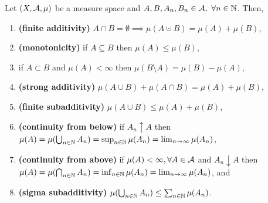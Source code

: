 \begin{thm}
	Let $(X, \mathcal{A}, \mu)$ be a measure space and $A, B, A_n, B_n \in \mathcal{A},\ \forall n \in \mathbb{N}$. Then,
	\begin{enumerate}
		\item \textbf{(finite additivity)} $A \cap B = \emptyset \implies \mu(A \cupdot B) = \mu(A) + \mu(B)$,
		\item \textbf{(monotonicity)} if $A \subseteq B$ then $\mu(A) \leq \mu(B)$,
		\item if $A \subset B$ and $\mu(A) < \infty$ then $\mu(B\setminus A) = \mu(B) - \mu(A)$,
		\item \textbf{(strong additivity)} $\mu(A \cup B) + \mu(A \cap B) = \mu(A) + \mu(B)$,
		\item \textbf{(finite subadditivity)} $\mu(A \cup B) \leq \mu(A) + \mu(B)$,
		\item \textbf{(continuity from below)} if $A_n \uparrow A$ then $\mu(A) = \mu(\bigcup_{n \in \mathbb{N}} A_n) = \sup_{n\in\mathbb{N}} \mu(A_n) = \lim_{n\to \infty} \mu(A_n)$,
		\item \textbf{(continuity from above)} if $\mu(A) < \infty, \forall A \in \mathcal{A}$ and $A_n \downarrow A$ then $\mu(A) = \mu(\bigcap_{n \in \mathbb{N}} A_n) = \inf_{n\in\mathbb{N}} \mu(A_n) = \lim_{n\to \infty} \mu(A_n)$, and
		\item \textbf{(sigma subadditivity)} $\mu(\bigcup_{n \in \mathbb{N}} A_n) \leq \sum_{n\in \mathbb{N}} \mu(A_n)$.
	\end{enumerate}
\end{thm}

